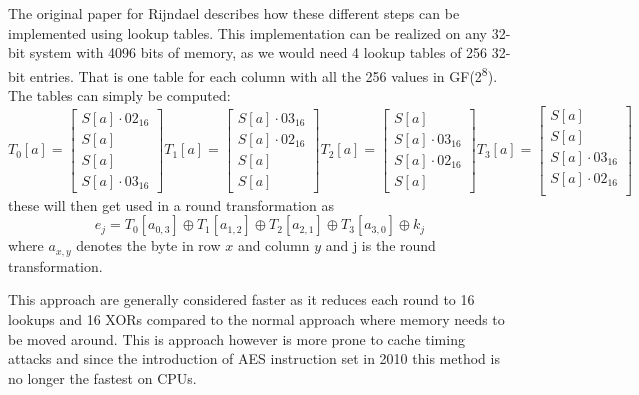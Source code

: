 \documentclass[a4paper, openany]{memoir}
\begin{document}
\begin{abstact}
The original paper for Rijndael\cite{Rijndael} describes how these different steps can be implemented using lookup tables. This implementation can be realized on any 32-bit system with 4096 bits of memory, as we would need 4 lookup tables of 256 32-bit entries. That is one table for each column with all the 256 values in GF(2\textsuperscript{8}). The tables can simply be computed:
\begin{equation}
T_0[a] = \begin{bmatrix}
          S[a] \cdot 02_{16}\\
          S[a]\\
          S[a]\\
          S[a] \cdot 03_{16}
\end{bmatrix}
T_1[a] = \begin{bmatrix}
          S[a] \cdot 03_{16}\\
          S[a] \cdot 02_{16}\\
          S[a]\\
          S[a]
\end{bmatrix}
T_2[a] = \begin{bmatrix}
          S[a]\\
          S[a] \cdot 03_{16}\\
          S[a] \cdot 02_{16}\\
          S[a]
\end{bmatrix}
T_3[a] = \begin{bmatrix}
          S[a]\\
          S[a]\\
          S[a] \cdot 03_{16}\\
          S[a] \cdot 02_{16}\\
\end{bmatrix}
\end{equation}
these will then get used in a round transformation as
\begin{equation}
e_j = T_0 [a_{0,3}] \oplus T_1 [a_{1,2}] \oplus T_2 [a_{2,1}] \oplus T_3 [a_{3,0}] \oplus k_j
\end{equation}
where \(a_{x,y}\) denotes the byte in row \(x\) and column \(y\) and j is the round transformation.

This approach are generally considered faster as it reduces each round to 16 lookups and 16 XORs compared to the normal approach where memory needs to be moved around. This is approach however is more prone to cache timing attacks and since the introduction of AES instruction set in 2010 this method is no longer the fastest on CPUs.

\end{abstact}
\end{document}
